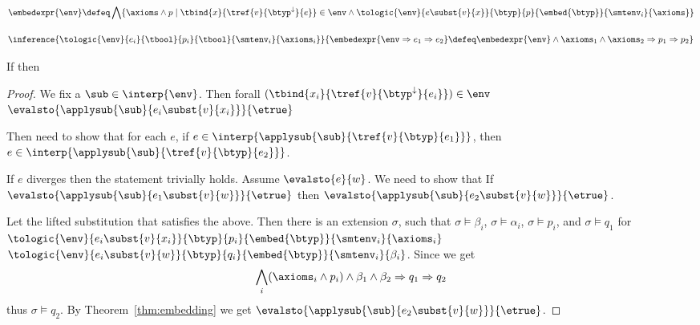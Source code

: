 \begin{align*}
\embedexpr{\env} \defeq
  \bigwedge\{ \axioms \land p \mid \tbind{x}{\tref{v}{\btyp^{\downarrow}}{e}} \in \env
   \land \tologic{\env}{e\subst{v}{x}}{\btyp}{p}{\embed{\btyp}}{\smtenv_i}{\axioms}  
   \}
\end{align*}




$$
\inference{
  \tologic{\env}{e_i}{\tbool}{p_i}{\tbool}{\smtenv_i}{\axioms_i}
}{
\embedexpr{\env \Rightarrow e_1 \Rightarrow e_2 } \defeq
  \embedexpr{\env} \land \axioms_1 \land \axioms_2 \Rightarrow p_1 \Rightarrow p_2 
}
$$


\begin{theorem}
If  
then 
\end{theorem}
\begin{proof}
We fix a $\sub\in\interp{\env}$.
Then forall $(\tbind{x_i}{\tref{v}{\btyp^{\downarrow}}{e_i}}) \in \env$ 
$\evalsto{\applysub{\sub}{e_i\subst{v}{x_i}}}{\etrue}$
 
Then need to show that for each $e$, 
if $e \in \interp{\applysub{\sub}{\tref{v}{\btyp}{e_1}}}$,
then $e \in \interp{\applysub{\sub}{\tref{v}{\btyp}{e_2}}}$.

If $e$ diverges then the statement trivially holds. 
Assume $\evalsto{e}{w}$. 
We need to show that 
If $\evalsto{\applysub{\sub}{e_1\subst{v}{w}}}{\etrue}$ then $\evalsto{\applysub{\sub}{e_2\subst{v}{w}}}{\etrue}$.

Let \vsub the lifted substitution that satisfies the above. 
Then there is an extension $\sigma$, such that 
$\sigma \models \beta_i$, $\sigma \models \alpha_i$, $\sigma\models p_i$, and $\sigma\models q_1$
for 
$\tologic{\env}{e_i\subst{v}{x_i}}{\btyp}{p_i}{\embed{\btyp}}{\smtenv_i}{\axioms_i}$
$\tologic{\env}{e_i\subst{v}{w}}{\btyp}{q_i}{\embed{\btyp}}{\smtenv_i}{\beta_i}$.
%
Since  we get 
$$
\bigwedge_i (\axioms_i \land p_i) 
\land \beta_1 \land \beta_2 
\Rightarrow q_1 \Rightarrow q_2
$$
thus $\sigma\models q_2$.
%
By Theorem~\ref{thm:embedding} we get $\evalsto{\applysub{\sub}{e_2\subst{v}{w}}}{\etrue}$.
\end{proof}
